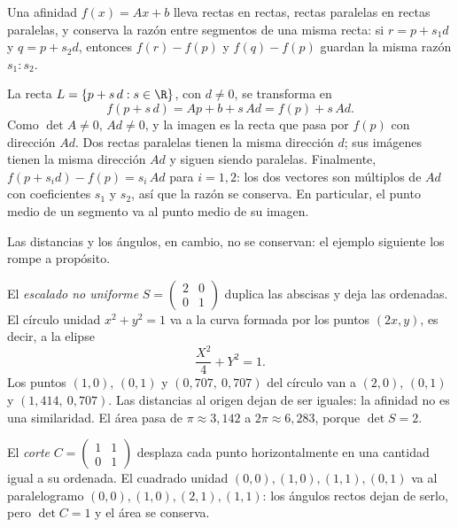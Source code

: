 \begin{proposicion}\label{prop:06-conserva}
Una afinidad \(f(x)=Ax+b\) lleva rectas en rectas, rectas paralelas en rectas paralelas, y
conserva la razón entre segmentos de una misma recta: si \(r=p+s_1d\) y \(q=p+s_2d\), entonces
\(f(r)-f(p)\) y \(f(q)-f(p)\) guardan la misma razón \(s_1:s_2\).
\end{proposicion}

\begin{demostracion}
La recta \(L=\{p+s\,d : s\in\R\}\), con \(d\neq0\), se transforma en
\[
  f(p+s\,d)=Ap+b+s\,Ad=f(p)+s\,Ad .
\]
Como \(\det A\neq0\), \(Ad\neq0\), y la imagen es la recta que pasa por \(f(p)\) con dirección
\(Ad\). Dos rectas paralelas tienen la misma dirección \(d\); sus imágenes tienen la misma
dirección \(Ad\) y siguen siendo paralelas. Finalmente, \(f(p+s_id)-f(p)=s_i\,Ad\) para
\(i=1,2\): los dos vectores son múltiplos de \(Ad\) con coeficientes \(s_1\) y \(s_2\), así que
la razón se conserva. En particular, el punto medio de un segmento va al punto medio de su
imagen.
\end{demostracion}

Las distancias y los ángulos, en cambio, no se conservan: el ejemplo siguiente los rompe a
propósito.

\begin{ejemplo}\label{ej:06-escalado}
El \emph{escalado no uniforme} \(S=\begin{pmatrix}2&0\\0&1\end{pmatrix}\) duplica las
abscisas y deja las ordenadas. El círculo unidad \(x^2+y^2=1\) va a la curva formada por los
puntos \((2x,y)\), es decir, a la elipse
\[
  \frac{X^2}{4}+Y^2=1 .
\]
Los puntos \((1,0)\), \((0,1)\) y \((0{,}707,\ 0{,}707)\) del círculo van a \((2,0)\), \((0,1)\) y
\((1{,}414,\ 0{,}707)\). Las distancias al origen dejan de ser iguales: la afinidad no es una
similaridad. El área pasa de \(\pi\approx3{,}142\) a \(2\pi\approx6{,}283\), porque
\(\det S=2\).

El \emph{corte} \(C=\begin{pmatrix}1&1\\0&1\end{pmatrix}\) desplaza cada punto horizontalmente
en una cantidad igual a su ordenada. El cuadrado unidad \((0,0),(1,0),(1,1),(0,1)\) va al
paralelogramo \((0,0),(1,0),(2,1),(1,1)\): los ángulos rectos dejan de serlo, pero
\(\det C=1\) y el área se conserva.
\end{ejemplo}

